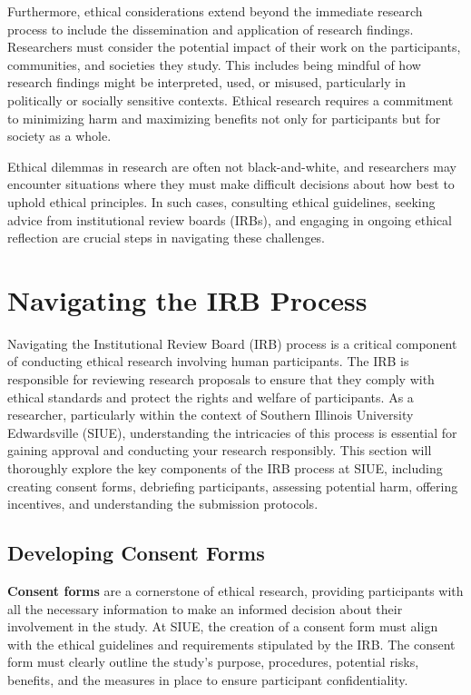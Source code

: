 \documentclass[
]{book}
\begin{document}
Furthermore, ethical considerations extend beyond the immediate research process to include the dissemination and application of research findings. Researchers must consider the potential impact of their work on the participants, communities, and societies they study. This includes being mindful of how research findings might be interpreted, used, or misused, particularly in politically or socially sensitive contexts. Ethical research requires a commitment to minimizing harm and maximizing benefits not only for participants but for society as a whole.

Ethical dilemmas in research are often not black-and-white, and researchers may encounter situations where they must make difficult decisions about how best to uphold ethical principles. In such cases, consulting ethical guidelines, seeking advice from institutional review boards (IRBs), and engaging in ongoing ethical reflection are crucial steps in navigating these challenges.

\section{Navigating the IRB Process}\label{navigating-the-irb-process}

Navigating the Institutional Review Board (IRB) process is a critical component of conducting ethical research involving human participants. The IRB is responsible for reviewing research proposals to ensure that they comply with ethical standards and protect the rights and welfare of participants. As a researcher, particularly within the context of Southern Illinois University Edwardsville (SIUE), understanding the intricacies of this process is essential for gaining approval and conducting your research responsibly. This section will thoroughly explore the key components of the IRB process at SIUE, including creating consent forms, debriefing participants, assessing potential harm, offering incentives, and understanding the submission protocols.

\subsection*{Developing Consent Forms}\label{developing-consent-forms}

\textbf{Consent forms} are a cornerstone of ethical research, providing participants with all the necessary information to make an informed decision about their involvement in the study. At SIUE, the creation of a consent form must align with the ethical guidelines and requirements stipulated by the IRB. The consent form must clearly outline the study's purpose, procedures, potential risks, benefits, and the measures in place to ensure participant confidentiality.
\end{document}
